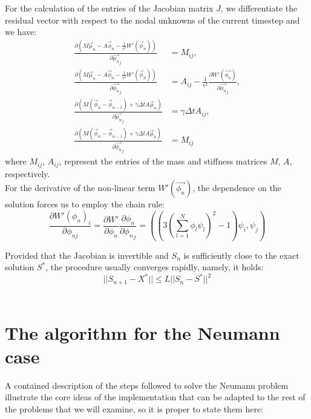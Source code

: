 \documentclass{article}
\begin{document}
For the calculation of the entries of the Jacobian matrix $J$, we differentiate the residual vector with respect to the nodal unknowns of the current timestep and we have:\\
\begin{align}
\frac{\partial (M \vec{\mu}_n - A \vec{\phi}_{n} - \frac{1}{\epsilon^2}W'(\vec{\phi}_{n}))}{\partial\vec{\mu_n}_j} &= M_{ij}, \\
\frac{\partial (M \vec{\mu}_n - A \vec{\phi}_{n} - \frac{1}{\epsilon^2}W'(\vec{\phi}_{n}))}{\partial\vec{\phi_n}_j} &= A_{ij}-\frac{1}{\epsilon^2}\frac{\partial W'(\vec{\phi_n})}{\partial \vec{\phi_n}_j}, \\
\frac{\partial (M(\vec{\phi}_{n}-\vec{\phi}_{n-1})+ \gamma \Delta t A \vec{\mu}_n)}{\partial\vec{\mu_n}_j} &= \gamma\Delta t A_{ij}, \\
\frac{\partial (M(\vec{\phi}_{n}-\vec{\phi}_{n-1})+ \gamma \Delta t A \vec{\mu}_k)}{\partial\vec{\phi_n}_j} &= M_{ij} 
\end{align}
where $M_{ij}$, $A_{ij}$, represent the entries of the mass and stiffness matrices $M$, $A$, respectively.\\

For the derivative of the non-linear term $W'(\vec{\phi_n})$, the dependence on the solution forces us to employ the chain rule:\\

\begin{equation}
\frac{\partial W'(\phi_n)_i}{\partial \phi_{nj}} = \frac{\partial W'}{\partial \phi_{n}} \frac{\partial \phi_n}{\partial{\phi_n}_j}= ((3(\sum_{l=1}^N\phi_{l}\psi_{l})^2-1)\psi_{i},\psi_{j})
\end{equation}


Provided that the Jacobian is invertible and $S_n$ is sufficiently close to the exact solution $S^*$, the procedure usually converges rapidly, namely, it holds:
\begin{equation}
||S_{n+1} - X^*|| \leq L ||S_n - S^*||^2
\end{equation}\\

\section{The algorithm for the Neumann case}
A contained description of the steps followed to solve the Neumann problem illustrate the core ideas of the implementation that can be adapted to the rest of the problems that we will examine, so it is proper to state them here:\\
\end{document}

